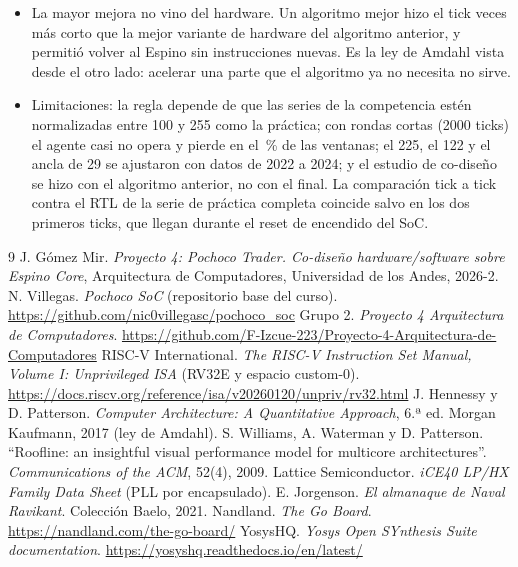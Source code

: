 \documentclass[11pt,letterpaper]{article}
\begin{document}
\begin{itemize}
\item La mayor mejora no vino del hardware. Un algoritmo mejor hizo el tick \ExtSpeedupMul{} veces más corto
que la mejor variante de hardware del algoritmo anterior, y permitió volver al Espino sin instrucciones
nuevas. Es la ley de Amdahl vista desde el otro lado: acelerar una parte que el algoritmo ya no necesita
no sirve.

\item Limitaciones: la regla depende de que las series de la competencia estén normalizadas entre 100 y
255 como la práctica; con rondas cortas (2000 ticks) el agente casi no opera y pierde en el
\ExtCortaPierde\,\% de las ventanas; el 225, el 122 y el ancla de 29 se ajustaron con datos de 2022 a
2024; y el estudio de co-diseño se hizo con el algoritmo anterior, no con el final. La comparación
tick a tick contra el RTL de la serie de práctica completa coincide salvo en los dos primeros ticks, que llegan
durante el reset de encendido del SoC.
\end{itemize}

\begin{thebibliography}{9}
 J. Gómez Mir. \emph{Proyecto 4: Pochoco Trader. Co-diseño hardware/software sobre
Espino Core}, Arquitectura de Computadores, Universidad de los Andes, 2026-2.
 N. Villegas. \emph{Pochoco SoC} (repositorio base del curso).
\url{https://github.com/nic0villegasc/pochoco_soc}
 Grupo 2. \emph{Proyecto 4 Arquitectura de Computadores}.
\url{https://github.com/F-Izcue-223/Proyecto-4-Arquitectura-de-Computadores}
 RISC-V International. \emph{The RISC-V Instruction Set Manual, Volume I: Unprivileged
ISA} (RV32E y espacio custom-0). \url{https://docs.riscv.org/reference/isa/v20260120/unpriv/rv32.html}
 J. Hennessy y D. Patterson. \emph{Computer Architecture: A Quantitative Approach}, 6.ª ed.
Morgan Kaufmann, 2017 (ley de Amdahl).
 S. Williams, A. Waterman y D. Patterson. ``Roofline: an insightful visual performance
model for multicore architectures''. \emph{Communications of the ACM}, 52(4), 2009.
 Lattice Semiconductor. \emph{iCE40 LP/HX Family Data Sheet} (PLL por encapsulado).
 E. Jorgenson. \emph{El almanaque de Naval Ravikant}. Colección Baelo, 2021.
 Nandland. \emph{The Go Board}. \url{https://nandland.com/the-go-board/}
 YosysHQ. \emph{Yosys Open SYnthesis Suite documentation}.
\url{https://yosyshq.readthedocs.io/en/latest/}
\end{thebibliography}
\end{document}
